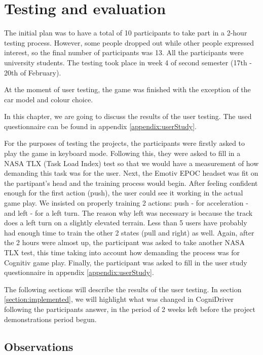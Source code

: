 \chapter{Testing and evaluation}
\label{cha:testing}

The initial plan was to have a total of 10 participants to take part in a 2-hour testing process. However, some people dropped out while other people expressed interest, so the final number of participants was 13. All the participants were university students. The testing took place in week 4 of second semester (17th - 20th of February).

At the moment of user testing, the game was finished with the exception of the car model and colour choice.

In this chapter, we are going to discuss the results of the user testing. The used questionnaire can be found in appendix \ref{appendix:userStudy}. 

For the purposes of testing the projects, the participants were firstly asked to play the game in keyboard mode. Following this, they were asked to fill in a NASA TLX (Task Load Index) test so that we would have a measurement of how demanding this task was for the user. Next, the Emotiv EPOC headset was fit on the partipant's head and the training process would begin. After feeling confident enough for the first action (push), the user could see it working in the actual game play. We insisted on properly training 2 actions: push - for acceleration - and left - for a left turn. The reason why left was necessary is because the track does a left turn on a slightly elevated terrain. Less than 5 users have probably had enough time to train the other 2 states (pull and right) as well. Again, after the 2 hours were almost up, the participant was asked to take another NASA TLX test, this time taking into account how demanding the process was for Cognitiv game play. Finally, the participant was asked to fill in the user study questionnaire in appendix \ref{appendix:userStudy}. 

The following sections will describe the results of the user testing. In section \ref{section:implemented}, we will highlight what was changed in CogniDriver following the participants answer, in the period of 2 weeks left before the project demonstrations period begun.

\section{Observations}

